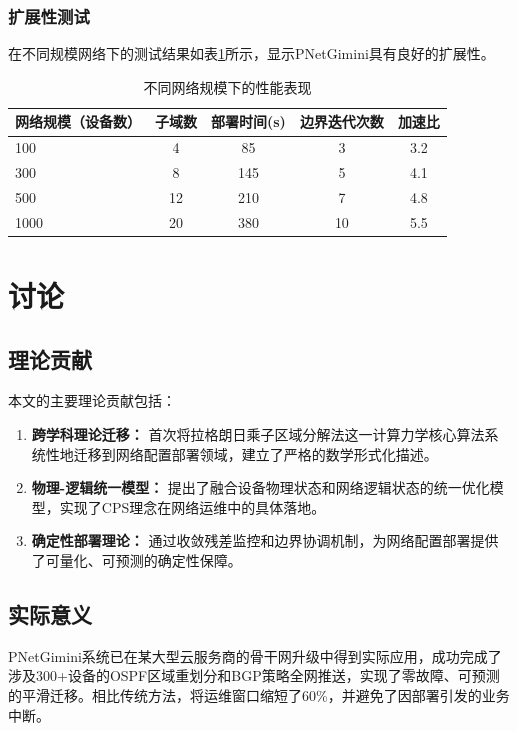\documentclass[12pt,a4paper]{article}
\begin{document}
\subsubsection{扩展性测试}
在不同规模网络下的测试结果如表\ref{tab:scalability}所示，显示PNetGimini具有良好的扩展性。

\begin{table}[htbp]
\centering
\caption{不同网络规模下的性能表现}
\label{tab:scalability}
\begin{tabular}{@{}lcccc@{}}
\toprule
\textbf{网络规模（设备数）} & \textbf{子域数} & \textbf{部署时间(s)} & \textbf{边界迭代次数} & \textbf{加速比} \\
\midrule
100 & 4 & 85 & 3 & 3.2 \\
300 & 8 & 145 & 5 & 4.1 \\
500 & 12 & 210 & 7 & 4.8 \\
1000 & 20 & 380 & 10 & 5.5 \\
\bottomrule
\end{tabular}
\end{table}

\section{讨论}
\label{sec:discussion}

\subsection{理论贡献}
本文的主要理论贡献包括：
\begin{enumerate}
    \item \textbf{跨学科理论迁移：} 首次将拉格朗日乘子区域分解法这一计算力学核心算法系统性地迁移到网络配置部署领域，建立了严格的数学形式化描述。
    \item \textbf{物理-逻辑统一模型：} 提出了融合设备物理状态和网络逻辑状态的统一优化模型，实现了CPS理念在网络运维中的具体落地。
    \item \textbf{确定性部署理论：} 通过收敛残差监控和边界协调机制，为网络配置部署提供了可量化、可预测的确定性保障。
\end{enumerate}

\subsection{实际意义}
PNetGimini系统已在某大型云服务商的骨干网升级中得到实际应用，成功完成了涉及300+设备的OSPF区域重划分和BGP策略全网推送，实现了零故障、可预测的平滑迁移。相比传统方法，将运维窗口缩短了60\%，并避免了因部署引发的业务中断。
\end{document}
